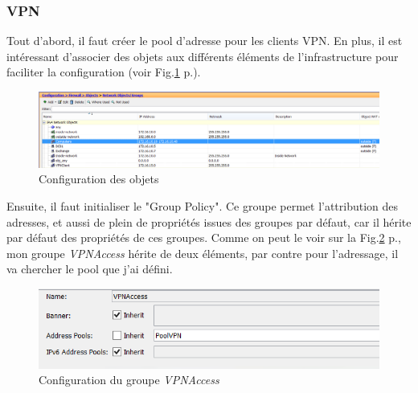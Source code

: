 \subsubsection{VPN}
Tout d'abord, il faut créer le pool d'adresse pour les clients VPN.
En plus, il est intéressant d'associer des objets aux différents éléments de l'infrastructure pour faciliter la configuration (voir Fig.\ref{fig:objectCisco} p.\pageref{fig:objectCisco}).
\begin{figure}[ht]
	\centering
	\includegraphics[width=16cm]{Cisco/objects.png}
	\caption{Configuration des objets}
	\label{fig:objectCisco}
\end{figure}

Ensuite, il faut initialiser le "Group Policy".
Ce groupe permet l'attribution des adresses, et aussi de plein de propriétés issues des groupes par défaut, car il hérite par défaut des propriétés de ces groupes. 
Comme on peut le voir sur la Fig.\ref{fig:gpCisco} p.\pageref{fig:gpCisco}, mon groupe \textit{VPNAccess} hérite de deux éléments, par contre pour l'adressage, il va chercher le pool que j'ai défini. 
\begin{figure}[ht]
	\centering
	\includegraphics{Cisco/GroupPoliciesVPN.png}
	\caption{Configuration du groupe \textit{VPNAccess}}
	\label{fig:gpCisco}
\end{figure}

